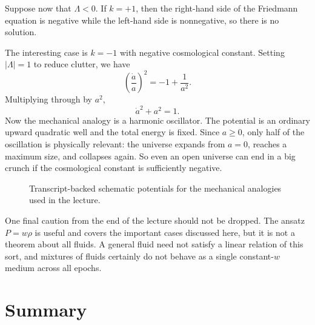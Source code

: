 Suppose now that \(\Lambda<0\). If \(k=+1\), then the right-hand side of the Friedmann equation is negative while the left-hand side is nonnegative, so there is no solution.

The interesting case is \(k=-1\) with negative cosmological constant. Setting \(|\Lambda|=1\) to reduce clutter, we have
\begin{equation}
\left(\frac{\dot a}{a}\right)^2=-1+\frac{1}{a^2}.
\end{equation}
Multiplying through by \(a^2\),
\begin{equation}
\dot a^2+a^2=1.
\end{equation}
Now the mechanical analogy is a harmonic oscillator. The potential is an ordinary upward quadratic well and the total energy is fixed. Since \(a\geq 0\), only half of the oscillation is physically relevant: the universe expands from \(a=0\), reaches a maximum size, and collapses again. So even an open universe can end in a big crunch if the cosmological constant is sufficiently negative.

\begin{figure}[h]
\centering
{}
\hspace{2em}
\caption{Transcript-backed schematic potentials for the mechanical analogies used in the lecture.}
\end{figure}

One final caution from the end of the lecture should not be dropped. The ansatz \(P=w\rho\) is useful and covers the important cases discussed here, but it is not a theorem about all fluids. A general fluid need not satisfy a linear relation of this sort, and mixtures of fluids certainly do not behave as a single constant-\(w\) medium across all epochs.

\section{Summary}

